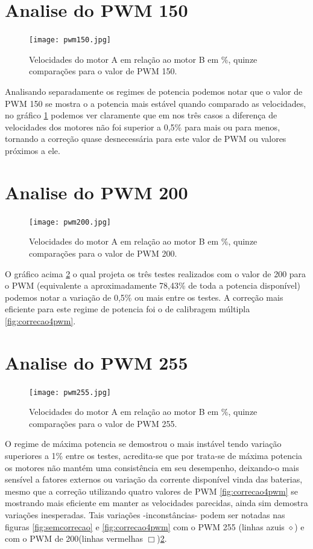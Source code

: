 \documentclass[a4paper,12pt,portuguese]{ufms-cpcx}
\begin{document}
\section{Analise do PWM 150}\label{pwm150}
\begin{figure}[H]	
	\centering
	\texttt{[image: pwm150.jpg]}
	\caption{Velocidades do motor A em relação ao motor B em \%, quinze comparações para o valor de PWM 150.}
	\label{fig:pwm150}
\end{figure}
Analisando separadamente os regimes de potencia podemos notar que o valor de PWM 150 se mostra o a potencia mais estável quando comparado as velocidades, no gráfico \ref{fig:pwm150} podemos ver claramente que em nos três casos a diferença de velocidades dos motores não foi superior a 0,5\% para mais ou para menos, tornando a correção quase desnecessária para este valor de PWM ou valores próximos a ele.

\section{Analise do PWM 200}\label{pwm200}
\begin{figure}[H]	
	\centering
	\texttt{[image: pwm200.jpg]}
	\caption{Velocidades do motor A em relação ao motor B em \%, quinze comparações para o valor de PWM 200.}
	\label{fig:pwm200}
\end{figure}
O gráfico acima \ref{fig:pwm200} o qual projeta os três testes realizados com o valor de 200 para o PWM (equivalente a aproximadamente 78,43\% de toda a potencia disponível) podemos notar a variação de 0,5\% ou mais entre os testes. A correção mais eficiente para este regime de potencia foi o de calibragem múltipla \ref{fig:correcao4pwm}.

\section{Analise do PWM 255}\label{pwm255}
\begin{figure}[H]	
	\centering
	\texttt{[image: pwm255.jpg]}
	\caption{Velocidades do motor A em relação ao motor B em \%, quinze comparações para o valor de PWM 255.}
	\label{fig:pwm255}
\end{figure}
O regime de máxima potencia se demostrou o mais instável tendo variação superiores a 1\% entre os testes, acredita-se que por trata-se de máxima potencia os motores não mantém uma consistência em seu desempenho, deixando-o mais sensível a fatores externos ou variação da corrente disponível vinda das baterias, mesmo que a correção utilizando quatro valores de PWM \ref{fig:correcao4pwm} se mostrando mais eficiente em manter as velocidades parecidas, ainda sim demostra variações inesperadas. Tais variações -inconstâncias- podem ser notadas nas figuras \ref{fig:semcorrecao} e \ref{fig:correcao4pwm} com o PWM 255 (linhas azuis $\diamond$) e com o PWM de 200(linhas vermelhas $\Box$)\ref{pwm200}.
\end{document}
